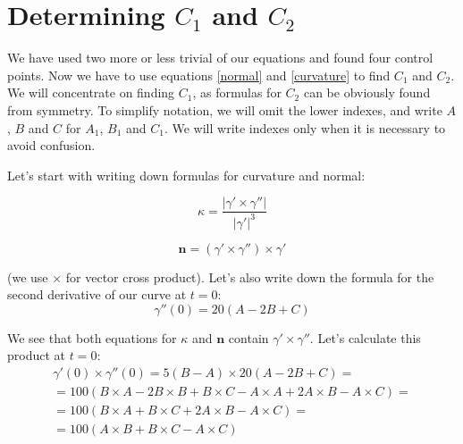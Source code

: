 \documentclass[12pt,a4paper]{article}
\begin{document}
\section{Determining $C_1$ and $C_2$}

We have used two more or less trivial of our equations and found four control points. Now we have to use equations \eqref{normal} and \eqref{curvature} to find $C_1$ and $C_2$. We will concentrate on finding $C_1$, as formulas for $C_2$ can be obviously found from symmetry. To simplify notation, we will omit the lower indexes, and write $A$, $B$ and $C$ for $A_1$, $B_1$ and $C_1$. We will write indexes only when it is necessary to avoid confusion.

Let's start with writing down formulas for curvature and normal:

\begin{equation}\label{curvature:def}
\kappa = \frac{|\gamma' \times \gamma''|}{|\gamma'|^3}
\end{equation}

\begin{equation}\label{normal:def}
\mathbf{n} = (\gamma' \times \gamma'') \times \gamma'
\end{equation}

(we use $\times$ for vector cross product). Let's also write down the formula for the second derivative of our curve at $t = 0$:
\begin{equation}\label{secondderivative}
\gamma''(0) = 20(A - 2B + C)
\end{equation}

We see that both equations for $\kappa$ and $\mathbf{n}$ contain $\gamma'\times\gamma''$. Let's calculate this product at $t=0$:
\begin{multline*}
\gamma'(0)\times\gamma''(0) = 5(B-A) \times 20 (A - 2B + C) = \\
= 100 (B\times A - 2B\times B + B\times C - A\times A + 2 A\times B - A\times C) = \\
= 100 (B\times A + B\times C + 2A\times B - A\times C) = \\
= 100 (A\times B + B\times C - A\times C)
\end{multline*}
\end{document}
